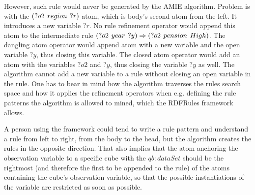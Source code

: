 However, such rule would never be generated by the AMIE algorithm. Problem is with the $(?o2\hspace{0.4em}region\hspace{0.4em}?r)$ atom, which is body's second atom from the left. It introduces a new variable $?r$. No rule refinement operator would append this atom to the intermediate rule $(?o2\hspace{0.4em}year\hspace{0.4em}?y) \Rightarrow (?o2\hspace{0.4em}pension\hspace{0.4em}High)$. The dangling atom operator would append atom with a new variable and the open variable $?y$, thus closing this variable. The closed atom operator would add an atom with the variables $?o2$ and $?y$, thus closing the variable $?y$ as well. The algorithm cannot add a new variable to a rule without closing an open variable in the rule. One has to bear in mind how the algorithm traverses the rules search space and how it applies the refinement operators when e.g. defining the rule patterns the algorithm is allowed to mined, which the RDFRules framework allows. 

A person using the framework could tend to write a rule pattern and understand a rule from left to right, from the body to the head, but the algorithm creates the rules in the opposite direction. That also implies that the atom anchoring the observation variable to a specific cube with the $qb:dataSet$ should be the rightmost (and therefore the first to be appended to the rule) of the atoms containing the cube's observation variable, so that the possible instantiations of the variable are restricted as soon as possible.